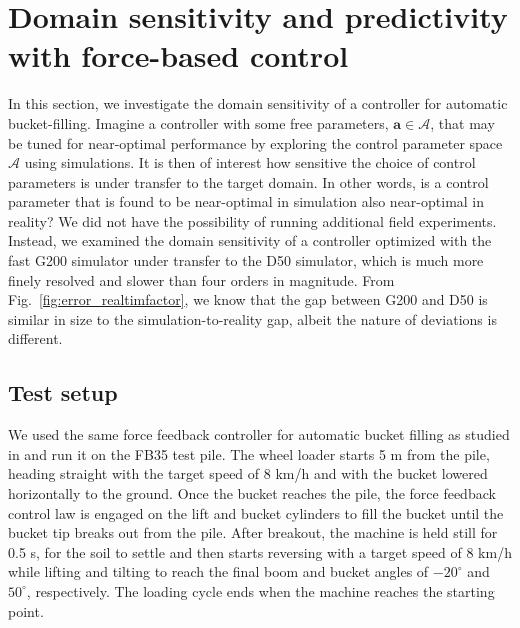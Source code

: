 \documentclass[10pt]{article}
\begin{document}
\section{Domain sensitivity and predictivity with force-based control}
\label{sec:domain_sensitivity}
In this section, we investigate the domain sensitivity of a controller for automatic bucket-filling.
Imagine a controller with some free parameters, $\bm{a} \in \mathcal{A}$, that may be tuned 
for near-optimal performance by exploring the control parameter space $\mathcal{A}$
using simulations. It is then of interest how sensitive the choice of control parameters is 
under transfer to the target domain. In other words, is a control parameter that is found to be
near-optimal in simulation also near-optimal in reality? We did not have the possibility of 
running additional field experiments. Instead, we examined the domain sensitivity of a 
controller optimized with the fast G200 simulator under transfer to the D50 simulator,
which is much more finely resolved and slower than four orders in magnitude. From Fig.~\ref{fig:error_realtimfactor},
we know that the gap between G200 and D50 is similar in size to the simulation-to-reality gap,
albeit the nature of deviations is different. 

\subsection{Test setup} %
We used the same force feedback controller for automatic bucket filling as studied in 
\cite{aoshima:2023:pmh} and run it on the FB35 test pile. The wheel loader starts 5 m from the pile, heading straight
with the target speed of 8 km/h and with the bucket lowered horizontally to the ground.
Once the bucket reaches the pile, the force feedback control law is engaged on the lift 
and bucket cylinders to fill the bucket until the bucket tip breaks out from the pile.
After breakout, the machine is held still for 0.5 s, for the soil to settle and then
starts reversing with a target speed of 8 km/h while lifting and tilting to reach the final boom 
and bucket angles of $-20^\circ$ and $50^\circ$, respectively. The loading cycle ends when the machine 
reaches the starting point. 
\end{document}
